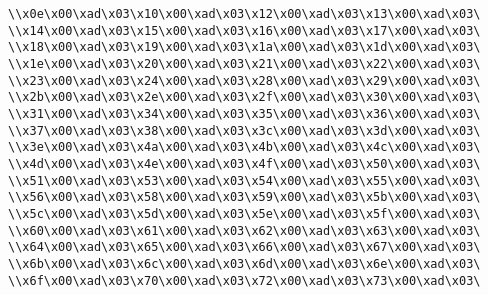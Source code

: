 \verb|\\x0e\x00\xad\x03\x10\x00\xad\x03\x12\x00\xad\x03\x13\x00\xad\x03\|\newline
\verb|\\x14\x00\xad\x03\x15\x00\xad\x03\x16\x00\xad\x03\x17\x00\xad\x03\|\newline
\verb|\\x18\x00\xad\x03\x19\x00\xad\x03\x1a\x00\xad\x03\x1d\x00\xad\x03\|\newline
\verb|\\x1e\x00\xad\x03\x20\x00\xad\x03\x21\x00\xad\x03\x22\x00\xad\x03\|\newline
\verb|\\x23\x00\xad\x03\x24\x00\xad\x03\x28\x00\xad\x03\x29\x00\xad\x03\|\newline
\verb|\\x2b\x00\xad\x03\x2e\x00\xad\x03\x2f\x00\xad\x03\x30\x00\xad\x03\|\newline
\verb|\\x31\x00\xad\x03\x34\x00\xad\x03\x35\x00\xad\x03\x36\x00\xad\x03\|\newline
\verb|\\x37\x00\xad\x03\x38\x00\xad\x03\x3c\x00\xad\x03\x3d\x00\xad\x03\|\newline
\verb|\\x3e\x00\xad\x03\x4a\x00\xad\x03\x4b\x00\xad\x03\x4c\x00\xad\x03\|\newline
\verb|\\x4d\x00\xad\x03\x4e\x00\xad\x03\x4f\x00\xad\x03\x50\x00\xad\x03\|\newline
\verb|\\x51\x00\xad\x03\x53\x00\xad\x03\x54\x00\xad\x03\x55\x00\xad\x03\|\newline
\verb|\\x56\x00\xad\x03\x58\x00\xad\x03\x59\x00\xad\x03\x5b\x00\xad\x03\|\newline
\verb|\\x5c\x00\xad\x03\x5d\x00\xad\x03\x5e\x00\xad\x03\x5f\x00\xad\x03\|\newline
\verb|\\x60\x00\xad\x03\x61\x00\xad\x03\x62\x00\xad\x03\x63\x00\xad\x03\|\newline
\verb|\\x64\x00\xad\x03\x65\x00\xad\x03\x66\x00\xad\x03\x67\x00\xad\x03\|\newline
\verb|\\x6b\x00\xad\x03\x6c\x00\xad\x03\x6d\x00\xad\x03\x6e\x00\xad\x03\|\newline
\verb|\\x6f\x00\xad\x03\x70\x00\xad\x03\x72\x00\xad\x03\x73\x00\xad\x03\|\newline
